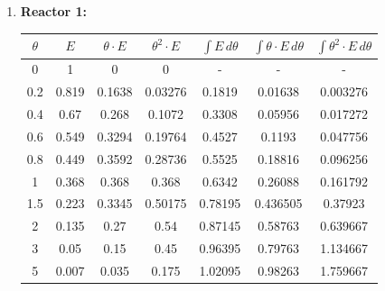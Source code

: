 \begin{enumerate}[label={\alph*)}]
	\item \textbf{Reactor 1:}
	      \begin{center}
		      \begin{tabular}{|c|c|c|c|c|c|c|}
			      \hline
			      $\theta$ & $E$   & $\theta \cdot E$ & $\theta^2 \cdot E$ & $\int E \, d\theta$ & $\int \theta \cdot E \, d\theta$ & $\int \theta^2 \cdot E \, d\theta$ \\ \hline
			      0        & 1     & 0                & 0                  & -                   & -                                & -                                  \\ \hline
			      0.2      & 0.819 & 0.1638           & 0.03276            & 0.1819              & 0.01638                          & 0.003276                           \\ \hline
			      0.4      & 0.67  & 0.268            & 0.1072             & 0.3308              & 0.05956                          & 0.017272                           \\ \hline
			      0.6      & 0.549 & 0.3294           & 0.19764            & 0.4527              & 0.1193                           & 0.047756                           \\ \hline
			      0.8      & 0.449 & 0.3592           & 0.28736            & 0.5525              & 0.18816                          & 0.096256                           \\ \hline
			      1        & 0.368 & 0.368            & 0.368              & 0.6342              & 0.26088                          & 0.161792                           \\ \hline
			      1.5      & 0.223 & 0.3345           & 0.50175            & 0.78195             & 0.436505                         & 0.37923                            \\ \hline
			      2        & 0.135 & 0.27             & 0.54               & 0.87145             & 0.58763                          & 0.639667                           \\ \hline
			      3        & 0.05  & 0.15             & 0.45               & 0.96395             & 0.79763                          & 1.134667                           \\ \hline
			      5        & 0.007 & 0.035            & 0.175              & 1.02095             & 0.98263                          & 1.759667                           \\ \hline

\end{tabular}
\end{center}
\end{enumerate}
